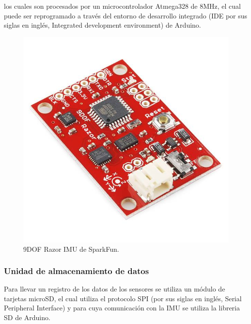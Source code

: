 	los cuales son procesados por un microcontrolador Atmega328 de 8MHz, el cual puede ser reprogramado a través del entorno de desarrollo integrado (IDE por sus siglas en inglés, Integrated development environment) de Arduino.

		\begin{figure}[h]
		\begin{center}
		\includegraphics[scale=0.3]{imagenes/3-boomerang/IMU.jpg}
		\caption{9DOF Razor IMU de SparkFun.}
		\label{fig19}
		\end{center}
		\end{figure}
\newpage
	\subsubsection{Unidad de almacenamiento de datos}

	Para llevar un registro de los datos de los sensores se utiliza un módulo de tarjetas microSD, el cual utiliza el protocolo SPI (por sus siglas en inglés, Serial Peripheral Interface) y para cuya comunicación con la IMU se utiliza la libreria SD de Arduino.


